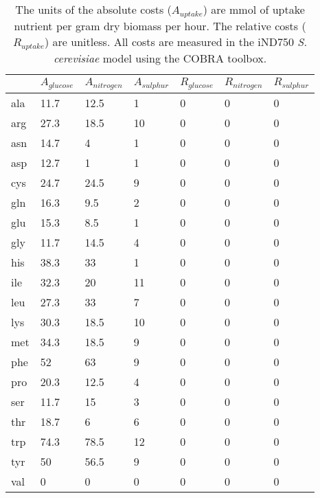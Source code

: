 \begin{table}
\begin{footnotesize}
  \begin{tabular}{ p{1cm} *{6}{p{1.9cm}} }
  \toprule
      & $A_{glucose}$ & $A_{nitrogen}$ & $A_{sulphur}$ & $R_{glucose} $ & $R_{nitrogen}$ & $R_{sulphur}$ \\ \midrule
      ala & 11.7 & 12.5 & 1  & 0 & 0 & 0 \\
      arg & 27.3 & 18.5 & 10 & 0 & 0 & 0 \\
      asn & 14.7 & 4    & 1  & 0 & 0 & 0 \\
      asp & 12.7 & 1    & 1  & 0 & 0 & 0 \\
      cys & 24.7 & 24.5 & 9  & 0 & 0 & 0 \\
      gln & 16.3 & 9.5  & 2  & 0 & 0 & 0 \\
      glu & 15.3 & 8.5  & 1  & 0 & 0 & 0 \\
      gly & 11.7 & 14.5 & 4  & 0 & 0 & 0 \\
      his & 38.3 & 33   & 1  & 0 & 0 & 0 \\
      ile & 32.3 & 20   & 11 & 0 & 0 & 0 \\
      leu & 27.3 & 33   & 7  & 0 & 0 & 0 \\
      lys & 30.3 & 18.5 & 10 & 0 & 0 & 0 \\
      met & 34.3 & 18.5 & 9  & 0 & 0 & 0 \\
      phe & 52   & 63   & 9  & 0 & 0 & 0 \\
      pro & 20.3 & 12.5 & 4  & 0 & 0 & 0 \\
      ser & 11.7 & 15   & 3  & 0 & 0 & 0 \\
      thr & 18.7 & 6    & 6  & 0 & 0 & 0 \\
      trp & 74.3 & 78.5 & 12 & 0 & 0 & 0 \\
      tyr & 50   & 56.5 & 9  & 0 & 0 & 0 \\
      val & 0    & 0    & 0  & 0 & 0 & 0 \\ \bottomrule
  \end{tabular}
\end{footnotesize}
\caption[\emph{S. cerevisiae} estimated absolute and relative amino acid costs]{The units of the absolute costs ($A_{uptake}$) are mmol of uptake nutrient per gram dry biomass per hour. The relative costs ($R_{uptake}$) are unitless. All costs are measured in the iND750 \emph{S. cerevisiae} model using the COBRA toolbox.} 
\label{appendix:table:estimated_costs}
\end{table}

